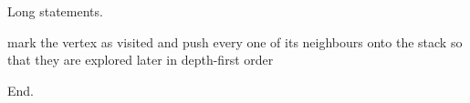 \documentclass{article}
\begin{document}
Long statements.

\begin{algorithm}[h]
\caption{Wrapping}
\begin{algorithmic}[1]
\State mark the vertex as visited and push every one of its neighbours onto the stack so that they are explored later in depth-first order
\EndIf
\EndFor
\end{algorithmic}
\end{algorithm}

End.
\end{document}
